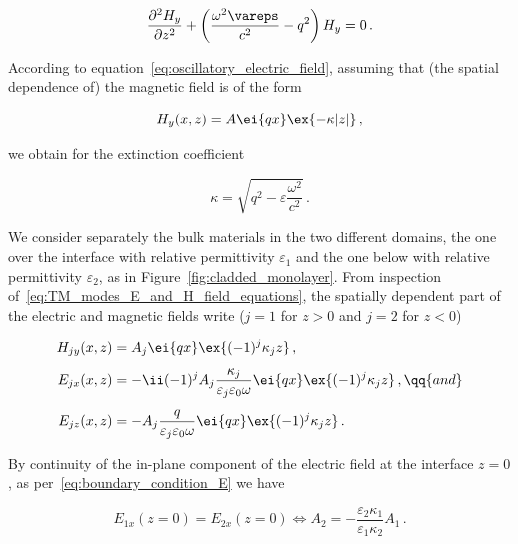 \begin{equation}
    \frac{\partial^2 H_y}{\partial z^2} + \left(\frac{\omega^2 \vareps}{c^2} - q^2\right) H_y = 0\,.
\end{equation}

\noindent According to equation~\eqref{eq:oscillatory_electric_field}, assuming that (the spatial dependence of) the magnetic field is of the form

\begin{equation}
    H_y (x,z) = A \ei{q x} \ex{- \kappa |z|}\,,
\end{equation}

\noindent we obtain for the extinction coefficient

\begin{equation}
    \kappa = \sqrt{q^2 - \varepsilon \frac{\omega^2}{c^2}}\,.
\end{equation}

\noindent We consider separately the bulk materials in the two different domains, the one over the interface with relative permittivity $\varepsilon_1$ and the one below with relative permittivity $\varepsilon_2$, as in Figure~\ref{fig:cladded_monolayer}.
From inspection of~\eqref{eq:TM_modes_E_and_H_field_equations}, the spatially dependent part of the electric and magnetic fields write ($j=1$ for $z>0$ and $j=2$ for $z<0$)

\begin{subequations}
    \begin{align}
        H_{jy}(x,z)&=A_j \ei{q x} \ex{ (-1)^{j} \kappa_j z}\,, \\[1ex]
        E_{jx}(x,z)&=- \ii (-1)^j A_j \frac{\kappa_j}{\varepsilon_j \varepsilon_0 \omega} \ei{q x} \ex{(-1)^{j} \kappa_j z}\,, \qq{and}\\[1ex]
        E_{jz}(x,z)&=-A_j \frac{q}{\varepsilon_j \varepsilon_0 \omega} \ei{q x} \ex{(-1)^{j} \kappa_j z}\,.
    \end{align}
    \label{eq:TM_modes_fields_solution_again}
\end{subequations}

\noindent By continuity of the in-plane component of the electric field at the interface $z=0$, as per~\eqref{eq:boundary_condition_E} we have

\begin{equation}
    E_{1 x} (z = 0) = E_{2 x} (z = 0) \Leftrightarrow A_2 = - \frac{\varepsilon_2 \kappa_1}{\varepsilon_1 \kappa_2} A_1\,.
    \label{eq:Et_continuity}
\end{equation}


